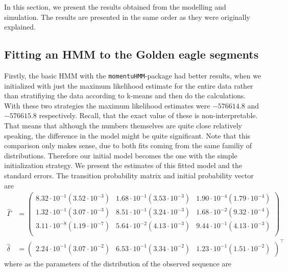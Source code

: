 
In this section, we present the results obtained from the modelling and simulation. The results are presented in the same order as they were originally explained.
\subsection{Fitting an HMM to the Golden eagle segments}
Firstly, the basic HMM with the \texttt{momentuHMM}-package had better results, when we initialized with just the maximum likelihood estimate for the entire data rather than stratifiying the data according to k-means and then do the calculations. With these two strategies the maximum likelihood estimates were $-576614.8$ and $-576615.8$ respectively. Recall, that the exact value of these is non-interpretable. That means that although the numbers themselves are quite close relatively speaking, the difference in the model might be quite significant. Note that this comparison only makes sense, due to both fits coming from the same familiy of distributions. Therefore our initial model becomes the one with the simple initialization strategy. We present the estimates of this fitted model and the standard errors. The transition probability matrix and initial probability vector are
\begin{align}
    \hat{\Gamma} &= \begin{pmatrix}
    8.32 \cdot 10^{-1} (3.52 \cdot 10^{-3}) & 1.68 \cdot 10^{-1} (3.53 \cdot 10^{-3}) & 1.90 \cdot 10^{-4} (1.79 \cdot 10^{-4})\\
    1.32 \cdot 10^{-1} (3.07 \cdot 10^{-3}) & 8.51 \cdot 10^{-1} (3.24 \cdot 10^{-3}) & 1.68 \cdot 10^{-2} (9.32 \cdot 10^{-4})\\
    3.11 \cdot 10^{-8} (1.19 \cdot 10^{-7}) & 5.64 \cdot 10^{-2} (4.13 \cdot 10^{-3}) & 9.44 \cdot 10^{-1} (4.13 \cdot 10^{-3})\\
    \end{pmatrix}\label{gammaMat1}\\
    \hat{\delta} &= \begin{pmatrix}
        2.24 \cdot 10^{-1} (3.07 \cdot 10^{-2}) &
        6.53 \cdot 10^{-1} (3.34 \cdot 10^{-2}) &
        1.23 \cdot 10^{-1} (1.51 \cdot 10^{-2})
    \end{pmatrix}^\top \label{deltaVec1}
    \end{align}
where as the parameters of the distribution of the observed sequence are
